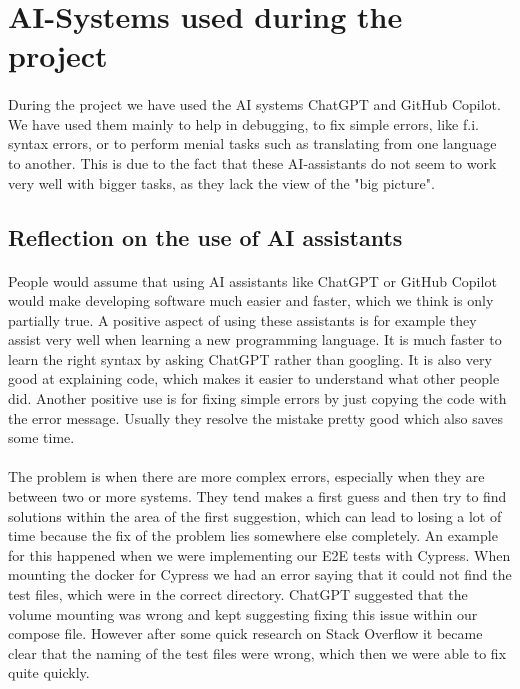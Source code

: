 \section{AI-Systems used during the project}
\paragraph{} During the project we have used the AI systems ChatGPT and GitHub Copilot. We have used them mainly to help in debugging, to fix simple errors, like f.i. syntax errors, or to perform menial tasks such as translating from one language to another. This is due to the fact that these AI-assistants do not seem to work very well with bigger tasks, as they lack the view of the "big picture".

\subsection{Reflection on the use of AI assistants}
\paragraph{} People would assume that using AI assistants like ChatGPT or GitHub Copilot would make developing software much easier and faster, which we think is only partially true. 
A positive aspect of using these assistants is for example they assist very well when learning a new programming language. It is much faster to learn the right syntax by asking ChatGPT rather than googling. It is also very good at explaining code, which makes it easier to understand what other people did. Another positive use is for fixing simple errors by just copying the code with the error message. Usually they resolve the mistake pretty good which also saves some time.

\paragraph{} The problem is when there are more complex errors, especially when they are between two or more systems. They tend makes a first guess and then try to find solutions within the area of the first suggestion, which can lead to losing a lot of time because the fix of the problem lies somewhere else completely. An example for this happened when we were implementing our E2E tests with Cypress. When mounting the docker for Cypress we had an error saying that it could not find the test files, which were in the correct directory. ChatGPT suggested that the volume mounting was wrong and kept suggesting fixing this issue within our compose file. However after some quick research on Stack Overflow it became clear that the naming of the test files were wrong, which then we were able to fix quite quickly. 

